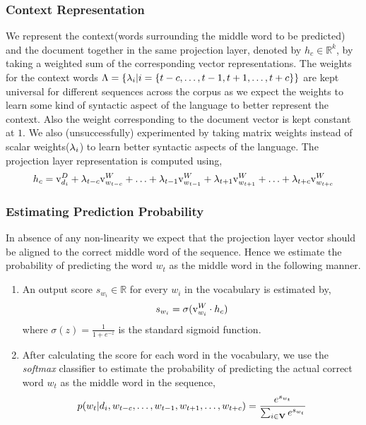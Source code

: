 \subsubsection{Context Representation}
We represent the context(words surrounding the middle word to be predicted) and the document together in the same projection layer, denoted by $h_{c} \in \mathbb{R}^{k}$, by taking a weighted sum of the corresponding vector representations. 
The weights for the context words $\Lambda = \{\lambda_{i} | i=\{t-c, \ldots, t-1, t+1, \ldots, t+c\}\}$ are kept universal for different sequences across the corpus as we expect the weights to learn some kind of syntactic aspect of the language to better represent the context. Also the weight corresponding to the document vector is kept constant at $1$. 
We also (unsuccessfully) experimented by taking matrix weights instead of scalar weights($\lambda_{i}$) to learn better syntactic aspects of the language. 
The projection layer representation is computed using,
\begin{equation}
\label{eq:hidden_vec}
h_{c} = \mathrm{v}^{D}_{d_{i}} + \lambda_{t-c}\mathrm{v}^{W}_{w_{t-c}} + \ldots + \lambda_{t-1}\mathrm{v}^{W}_{w_{t-1}} + \lambda_{t+1}\mathrm{v}^{W}_{w_{t+1}} + \ldots + \lambda_{t+c}\mathrm{v}^{W}_{w_{t+c}}
\end{equation}

\subsubsection{Estimating Prediction Probability}
In absence of any non-linearity we expect that the projection layer vector should be aligned to the correct middle word of the sequence. Hence we estimate the probability of predicting the word $w_{t}$ as the middle word in the following manner. 
\begin{enumerate}
\item An output score $s_{w_{i}} \in \mathbb{R}$ for every $w_{i}$ in the vocabulary is estimated by,
\begin{equation}
\label{eq:nn_score}
s_{w_{i}} = \sigma(\mathrm{v}^{W}_{w_{i}}\cdot h_{c})
\end{equation}
where $\sigma(z) = \frac{1}{1+e^{-z}}$ is the standard sigmoid function. 
\item After calculating the score for each word in the vocabulary, we use the \emph{softmax} classifier to estimate the probability of predicting the actual correct word $w_{t}$ as the middle word in the sequence,
\begin{equation}
\label{eq:soft_prob}
p(w_{t} | d_{i}, w_{t-c}, \ldots, w_{t-1}, w_{t+1}, \ldots, w_{t+c}) = \frac{e^{s_{w_{t}}}}{\sum_{i \in \mathbf{V}} e^{s_{w_{t}}}}
\end{equation}
\end{enumerate}

